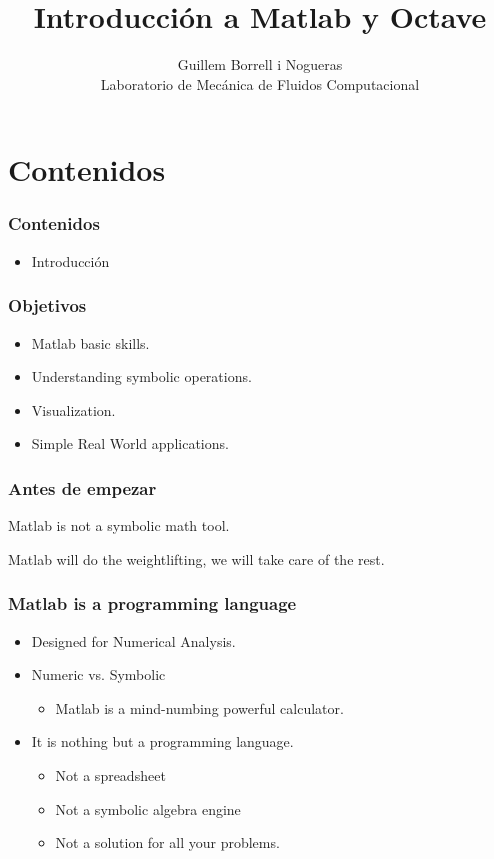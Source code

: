 \documentclass[12pt]{beamer}
\title{Introducción a Matlab y Octave}
\author{Guillem Borrell i Nogueras\\
Laboratorio de Mecánica de Fluidos Computacional}
\begin{document}

\begin{frame}
  \titlepage
\end{frame}

\begin{frame}
  \tableofcontents[pausesections]
\end{frame}


\section{Contenidos}

\begin{frame}
\frametitle{Contenidos}
\begin{itemize}
\item Introducción
\end{itemize}
\end{frame}

\begin{frame}
  \frametitle{Objetivos}
  \begin{itemize}
  \item Matlab basic skills.
  \item Understanding symbolic operations.
  \item Visualization.
  \item Simple Real World applications.
  \end{itemize}
\end{frame}

\begin{frame}
  \frametitle{Antes de empezar}
  \begin{Huge}
    \begin{center}
      Matlab is not a symbolic math tool.
    \end{center}
  \end{Huge}
  Matlab will do the weightlifting, we will take care of the rest.
\end{frame}

\begin{frame}
  \frametitle{Matlab is a programming language}
  \begin{itemize}
  \item Designed for Numerical Analysis.
  \item Numeric vs. Symbolic
    \begin{itemize}
    \item Matlab is a mind-numbing powerful calculator.
    \end{itemize}
  \item It is nothing but a programming language.
    \begin{itemize}
    \item Not a spreadsheet
    \item Not a symbolic algebra engine
    \item Not a solution for all your problems.
    \end{itemize}
  \end{itemize}
\end{frame}
\end{document}
